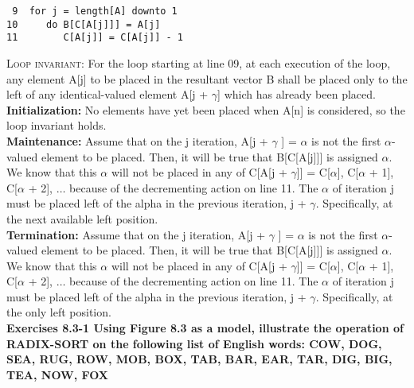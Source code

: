 \documentclass[10pt,fullpage]{article}
\begin{document}
\begin{verbatim}
 9  for j = length[A] downto 1
10     do B[C[A[j]]] = A[j]
11        C[A[j]] = C[A[j]] - 1
\end{verbatim}

\textsc{Loop invariant:} For the loop starting at line 09, at each
execution of the loop, any element A[j] to be placed in the
resultant vector B shall be placed only to the left of any
identical-valued element A[j + $\gamma$] which has already been placed.\\
\textbf{Initialization:} No elements have yet been placed when A[n]
is considered, so the loop invariant holds.\\
\textbf{Maintenance:} Assume that on the j iteration, A[j +
$\gamma$ ] = $\alpha$ is not the first $\alpha$-valued element to
be placed. Then, it will be true that B[C[A[j]]] is assigned
$\alpha$. We know that this $\alpha$ will not be placed in any of
C[A[j + $\gamma$]] = C[$\alpha$], C[$\alpha$ + 1], C[$\alpha$ +
2], $\ldots$ because of the decrementing action on line 11. The
$\alpha$ of iteration j must be placed left of the alpha in the
previous iteration, j + $\gamma$. Specifically, at the next
available left position.\\
\textbf{Termination:}  Assume that on the j iteration, A[j +
$\gamma$ ] = $\alpha$ is not the first $\alpha$-valued element to
be placed. Then, it will be true that B[C[A[j]]] is assigned
$\alpha$. We know that this $\alpha$ will not be placed in any of
C[A[j + $\gamma$]] = C[$\alpha$], C[$\alpha$ + 1], C[$\alpha$ +
2], $\ldots$ because of the decrementing action on line 11. The
$\alpha$ of iteration j must be placed left of the alpha in the
previous iteration, j + $\gamma$. Specifically, at the only left
position.\\

\newpage
\textbf{Exercises 8.3-1 Using Figure 8.3 as a model, illustrate
the operation of RADIX-SORT on the following list of English
words: COW, DOG, SEA, RUG, ROW, MOB, BOX, TAB, BAR, EAR, TAR, DIG,
BIG, TEA, NOW, FOX}
\end{document}
